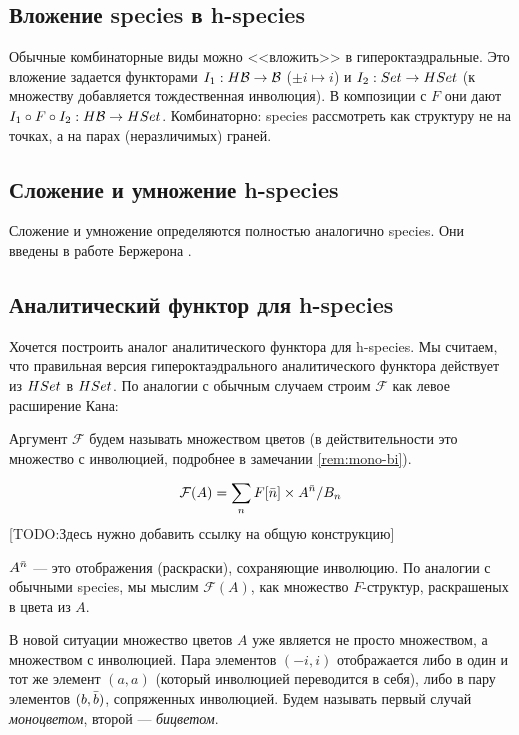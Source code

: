 \subsection{Вложение species в h-species}
Обычные комбинаторные виды можно <<вложить>> в гипероктаэдральные. Это вложение
задается функторами $I_1:H\mathcal B \rightarrow \mathcal B$ ($\pm i \mapsto i$) и $I_2:Set
\rightarrow HSet$ (к множеству добавляется тождественная инволюция).
В композиции с $F$ они дают $I_1 \circ F \circ I_2 : H\mathcal B \rightarrow HSet$.
Комбинаторно: species рассмотреть как структуру не на точках, а на
парах (неразличимых) граней.

\subsection{Сложение и умножение h-species}
Сложение и умножение определяются полностью аналогично species. Они введены в
работе Бержерона \cite{BergH}.

\subsection{Аналитический функтор для h-species}
Хочется построить аналог аналитического функтора для h-species. Мы считаем, что
правильная версия гипероктаэдрального аналитического функтора действует из
$HSet$ в $HSet$. По аналогии с обычным случаем строим $\mathcal F$ как левое
расширение Кана:


Аргумент $\mathcal F$ будем называть множеством цветов (в действительности это
множество с инволюцией, подробнее в замечании \ref{rem:mono-bi}).

\begin{equation}
\label{eq:h-an}
	\mathcal F(A) = \sum\limits_n F[\Bar n] \times A^{\Bar n} / B_n
\end{equation}
[TODO:Здесь нужно добавить ссылку на общую конструкцию]

$A^{\Bar n}$ --- это отображения (раскраски), сохраняющие инволюцию. По
аналогии с обычными species, мы мыслим $\mathcal F(A)$, как множество
$F$-структур, раскрашеных в цвета из $A$.
\begin{remark}
\label{rem:mono-bi}
В новой ситуации множество цветов $A$ уже является не просто множеством, а
множеством с инволюцией. Пара элементов $(-i, i)$ отображается либо
в один и тот же элемент $(a, a)$ (который инволюцией переводится в себя), либо
в пару элементов $(b, \Bar b)$, сопряженных инволюцией. Будем называть первый
случай \emph{моноцветом}, второй --- \emph{бицветом}.
\end{remark}

